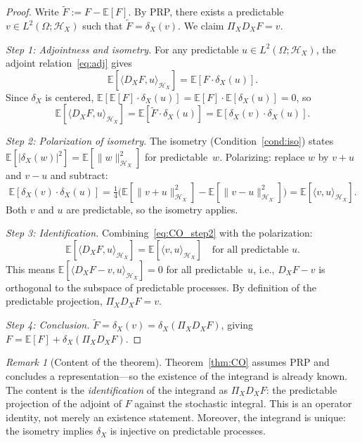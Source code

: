 \documentclass[11pt,a4paper]{article}
\theoremstyle{plain}
\theoremstyle{definition}
\theoremstyle{remark}
\newtheorem{remark}[theorem]{Remark}
\newcommand{\E}{\mathbb{E}}
\newcommand{\HX}{\mathcal{H}_X}
\begin{document}
\begin{proof}
Write $\tilde{F} := F - \E[F]$. By PRP, there exists a predictable $v \in L^2(\Omega; \HX)$ such that $\tilde{F} = \delta_X(v)$. We claim $\Pi_X D_X F = v$.

\emph{Step 1: Adjointness and isometry.} For any predictable $u \in L^2(\Omega; \HX)$, the adjoint relation~\eqref{eq:adj} gives
\begin{equation}\label{eq:CO_step1}
\E[\langle D_X F, u \rangle_{\HX}] = \E[F \cdot \delta_X(u)].
\end{equation}
Since $\delta_X$ is centered, $\E[\E[F] \cdot \delta_X(u)] = \E[F] \cdot \E[\delta_X(u)] = 0$, so
\begin{equation}\label{eq:CO_step2}
\E[\langle D_X F, u \rangle_{\HX}] = \E[\tilde{F} \cdot \delta_X(u)] = \E[\delta_X(v) \cdot \delta_X(u)].
\end{equation}

\emph{Step 2: Polarization of isometry.} The isometry (Condition~\ref{cond:iso}) states $\E[|\delta_X(w)|^2] = \E[\|w\|^2_{\HX}]$ for predictable~$w$. Polarizing: replace $w$ by $v + u$ and $v - u$ and subtract:
\[
\E[\delta_X(v) \cdot \delta_X(u)] = \tfrac{1}{4}\bigl(\E[\|v+u\|^2_{\HX}] - \E[\|v-u\|^2_{\HX}]\bigr) = \E[\langle v, u \rangle_{\HX}].
\]
Both $v$ and $u$ are predictable, so the isometry applies.

\emph{Step 3: Identification.} Combining~\eqref{eq:CO_step2} with the polarization:
\begin{equation}\label{eq:CO_step3}
\E[\langle D_X F, u \rangle_{\HX}] = \E[\langle v, u \rangle_{\HX}] \quad \text{for all predictable } u.
\end{equation}
This means $\E[\langle D_X F - v, u \rangle_{\HX}] = 0$ for all predictable~$u$, i.e., $D_X F - v$ is orthogonal to the subspace of predictable processes. By definition of the predictable projection, $\Pi_X D_X F = v$.

\emph{Step 4: Conclusion.} $\tilde{F} = \delta_X(v) = \delta_X(\Pi_X D_X F)$, giving $F = \E[F] + \delta_X(\Pi_X D_X F)$.
\end{proof}

\begin{remark}[Content of the theorem]\label{rem:CO_content}
Theorem~\ref{thm:CO} assumes PRP and concludes a representation---so the existence of the integrand is already known. The content is the \emph{identification} of the integrand as $\Pi_X D_X F$: the predictable projection of the adjoint of $F$ against the stochastic integral. This is an operator identity, not merely an existence statement. Moreover, the integrand is unique: the isometry implies $\delta_X$ is injective on predictable processes.
\end{remark}
\end{document}
